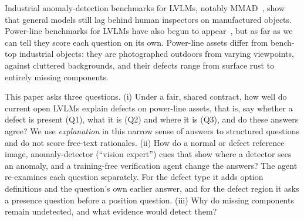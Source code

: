 \documentclass[11pt]{article}
\begin{document}
Industrial anomaly-detection benchmarks for LVLMs, notably MMAD~\cite{jiang2025mmad}, show that general models still lag behind human inspectors on manufactured objects. Power-line benchmarks for LVLMs have also begun to appear~\cite{wang2024powerllava,zhong2026powergpt,zhang2026elecvqa}, but as far as we can tell they score each question on its own. Power-line assets differ from bench-top industrial objects: they are photographed outdoors from varying viewpoints, against cluttered backgrounds, and their defects range from surface rust to entirely missing components.

This paper asks three questions. (i) Under a fair, shared contract, how well do current open LVLMs explain defects on power-line assets, that is, say whether a defect is present (Q1), what it is (Q2) and where it is (Q3), and do these answers agree? We use \emph{explanation} in this narrow sense of answers to structured questions and do not score free-text rationales. (ii) How do a normal or defect reference image, anomaly-detector (``vision expert'') cues that show where a detector sees an anomaly, and a training-free verification agent change the answers? The agent re-examines each question separately. For the defect type it adds option definitions and the question's own earlier answer, and for the defect region it asks a presence question before a position question. (iii) Why do missing components remain undetected, and what evidence would detect them?
\end{document}
